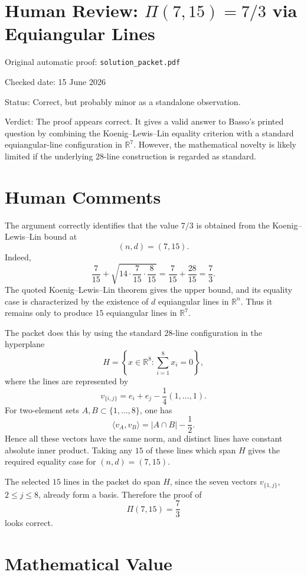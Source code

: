 \documentclass[11pt]{article}
\begin{document}
\section*{Human Review: \(\Pi(7,15)=7/3\) via Equiangular Lines}

\noindent Original automatic proof: \texttt{solution\_packet.pdf}

\noindent Checked date: 15 June 2026

\noindent Status: Correct, but probably minor as a standalone observation.

\noindent Verdict: The proof appears correct. It gives a valid answer to Basso's printed question by combining the Koenig--Lewis--Lin equality criterion with a standard equiangular-line configuration in \(\mathbb R^7\). However, the mathematical novelty is likely limited if the underlying \(28\)-line construction is regarded as standard.

\section*{Human Comments}

The argument correctly identifies that the value \(7/3\) is obtained from the Koenig--Lewis--Lin bound at
\[
(n,d)=(7,15).
\]
Indeed,
\[
\frac7{15}
+
\sqrt{14\cdot\frac7{15}\cdot\frac8{15}}
=
\frac7{15}+\frac{28}{15}
=
\frac73.
\]
The quoted Koenig--Lewis--Lin theorem gives the upper bound, and its equality case is characterized by the existence of \(d\) equiangular lines in \(\mathbb R^n\). Thus it remains only to produce \(15\) equiangular lines in \(\mathbb R^7\).

The packet does this by using the standard \(28\)-line configuration in the hyperplane
\[
H=\left\{x\in\mathbb R^8:\sum_{i=1}^8 x_i=0\right\},
\]
where the lines are represented by
\[
v_{\{i,j\}}
=
e_i+e_j-\frac14(1,\ldots,1).
\]
For two-element sets \(A,B\subset\{1,\ldots,8\}\), one has
\[
\langle v_A,v_B\rangle=|A\cap B|-\frac12.
\]
Hence all these vectors have the same norm, and distinct lines have constant absolute inner product. Taking any \(15\) of these lines which span \(H\) gives the required equality case for \((n,d)=(7,15)\).

The selected \(15\) lines in the packet do span \(H\), since the seven vectors \(v_{\{1,j\}}\), \(2\leq j\leq 8\), already form a basis. Therefore the proof of
\[
\Pi(7,15)=\frac73
\]
looks correct.

\section*{Mathematical Value}
\end{document}
